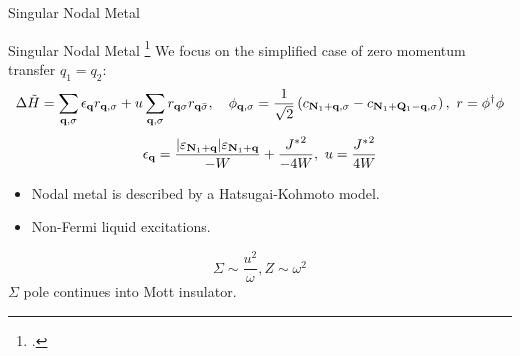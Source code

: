 \documentclass[10pt,aspectratio=169]{beamer}
\begin{document}
\begin{frame}{Singular Nodal Metal}
{\begin{minipage}{0.65\textwidth}
		\vspace{5pt}
	\end{minipage}
	}
	
\end{frame}

\begin{frame}{Singular Nodal Metal}
	\footcite{Baskaran1991,Hatsugai1992,Phillips2020}
	We focus on the simplified case of zero momentum transfer \(q_1=q_2\):
	\[ \Delta \tilde H = \sum_{{\bf q},\sigma}\epsilon_{{\bf q}}{r}_{{\bf q},\sigma} + u\sum_{{\bf q}, \sigma}r_{{\bf q} \sigma} r_{{\bf q} \bar\sigma},\quad\phi_{{\bf q}, \sigma} = \frac{1}{\sqrt 2}\left(c_{{\bf N}_1 + {\bf q},\sigma} - c_{{\bf N}_1 + {\bf Q}_1 - {\bf q}, \sigma}\right),~r = \phi^\dagger \phi \]
	\[\epsilon_{\bf q} = \frac{|\varepsilon_{{\bf N}_1 + {\bf q}}|\varepsilon_{{\bf N}_1 + {\bf q}}}{-W} + \frac{{J^*}^2}{-4W},~u = \frac{{J^*}^2}{4W}\]
	\begin{minipage}{0.5\textwidth}
	\begin{itemize}
		\item Nodal metal is described by a \alert{Hatsugai-Kohmoto model}.
		\item Non-Fermi liquid excitations.
	\end{itemize}
	\[\Sigma \sim \frac{u^2}{\omega}, Z \sim \omega^2\]
	\(\Sigma\) pole continues into \alert{Mott insulator}.
	\end{minipage}
	\hfill
	

\end{frame}
\end{document}
